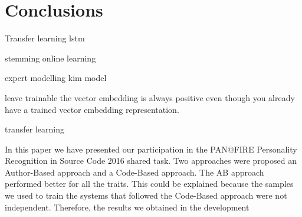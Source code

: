 \section{Conclusions} \label{sec:conclusion}

Transfer learning  lstm

stemming online learning 

expert modelling kim model

leave trainable the vector embedding is always positive even though you already have a trained vector embedding representation.

transfer learning


In this paper we have presented our participation in the PAN@FIRE Personality Recognition in Source Code 2016 shared task. Two approaches were proposed an Author-Based approach and a Code-Based approach. The AB approach performed better for all the traits. This could be explained because the samples we used to train the systems that followed the Code-Based approach were not independent. Therefore, the results we obtained in the development